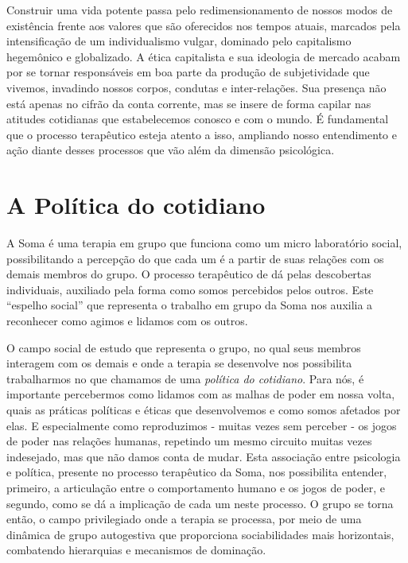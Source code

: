 Construir uma vida potente passa pelo redimensionamento de nossos modos
de existência frente aos valores que são oferecidos nos tempos atuais,
marcados pela intensificação de um individualismo vulgar, dominado pelo
capitalismo hegemônico e globalizado. A ética capitalista e sua
ideologia de mercado acabam por se tornar responsáveis em boa parte da
produção de subjetividade que vivemos, invadindo nossos corpos, condutas
e inter-relações. Sua presença não está apenas no cifrão da conta
corrente, mas se insere de forma capilar nas atitudes cotidianas que
estabelecemos conosco e com o mundo. É fundamental que o processo
terapêutico esteja atento a isso, ampliando nosso entendimento e ação
diante desses processos que vão além da dimensão psicológica.

\section{A Política do cotidiano}

A Soma é uma terapia em grupo que funciona como um micro laboratório
social, possibilitando a percepção do que cada um é a partir de suas
relações com os demais membros do grupo. O processo terapêutico de dá
pelas descobertas individuais, auxiliado pela forma como somos
percebidos pelos outros. Este ``espelho social'' que representa o
trabalho em grupo da Soma nos auxilia a reconhecer como agimos e lidamos
com os outros.

O campo social de estudo que representa o grupo, no qual seus membros
interagem com os demais e onde a terapia se desenvolve nos possibilita
trabalharmos no que chamamos de uma \emph{política do cotidiano}. Para
nós, é importante percebermos como lidamos com as malhas de poder em
nossa volta, quais as práticas políticas e éticas que desenvolvemos e
como somos afetados por elas. E especialmente como reproduzimos - muitas
vezes sem perceber - os jogos de poder nas relações humanas, repetindo
um mesmo circuito muitas vezes indesejado, mas que não damos conta de
mudar. Esta associação entre psicologia e política, presente no processo
terapêutico da Soma, nos possibilita entender, primeiro, a articulação
entre o comportamento humano e os jogos de poder, e segundo, como se dá
a implicação de cada um neste processo. O grupo se torna então, o campo
privilegiado onde a terapia se processa, por meio de uma dinâmica de
grupo autogestiva que proporciona sociabilidades mais horizontais,
combatendo hierarquias e mecanismos de dominação.

